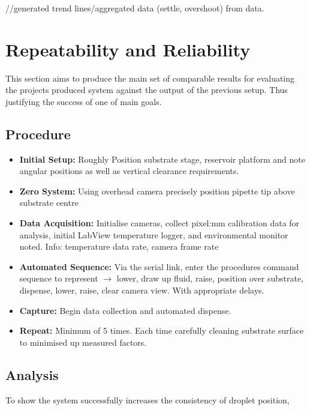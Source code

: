 //generated trend lines/aggregated data (settle, overshoot) from data.

\section{Repeatability and Reliability}

This section aims to produce the main set of comparable results for evaluating the projects produced system against the output of the previous setup. Thus justifying the success of one of main goals.

\subsection{Procedure}
\begin{itemize}
    \item \textbf{Initial Setup:} Roughly Position substrate stage, reservoir platform and note angular positions as well as vertical clearance requirements.
    \item \textbf{Zero System:} Using overhead camera precisely position pipette tip above substrate centre
    \item \textbf{Data Acquisition:} Initialise cameras, collect pixel:mm calibration data for analysis, initial LabView temperature logger, and environmental monitor noted. Info: temperature data rate, camera frame rate
    \item \textbf{Automated Sequence:} Via the serial link, enter the procedures command sequence to represent $\rightarrow$ lower, draw up fluid, raise, position over substrate, dispense, lower, raise, clear camera view. With appropriate delays.
    \item \textbf{Capture:} Begin data collection and automated dispense.
    \item \textbf{Repeat: } Minimum of 5 times. Each time carefully cleaning substrate surface to minimised up measured factors. 
\end{itemize}

\subsection{Analysis}

To show the system successfully increases the consistency of droplet position,